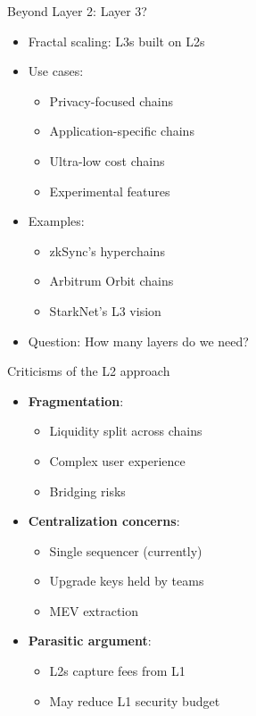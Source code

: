 \documentclass[aspectratio=169, lualatex, handout]{beamer}
\begin{document}
\begin{frame}{Beyond Layer 2: Layer 3?}
	\begin{itemize}
		\item Fractal scaling: L3s built on L2s
		\item Use cases:
		      \begin{itemize}
			      \item Privacy-focused chains
			      \item Application-specific chains
			      \item Ultra-low cost chains
			      \item Experimental features
		      \end{itemize}
		\item Examples:
		      \begin{itemize}
			      \item zkSync's hyperchains
			      \item Arbitrum Orbit chains
			      \item StarkNet's L3 vision
		      \end{itemize}
		\item Question: How many layers do we need?
	\end{itemize}
\end{frame}

\begin{frame}{Criticisms of the L2 approach}
	\begin{itemize}
		\item \textbf{Fragmentation}:
		      \begin{itemize}
			      \item Liquidity split across chains
			      \item Complex user experience
			      \item Bridging risks
		      \end{itemize}
		\item \textbf{Centralization concerns}:
		      \begin{itemize}
			      \item Single sequencer (currently)
			      \item Upgrade keys held by teams
			      \item MEV extraction
		      \end{itemize}
		\item \textbf{Parasitic argument}:
		      \begin{itemize}
			      \item L2s capture fees from L1
			      \item May reduce L1 security budget
		      \end{itemize}
	\end{itemize}
\end{frame}
\end{document}
